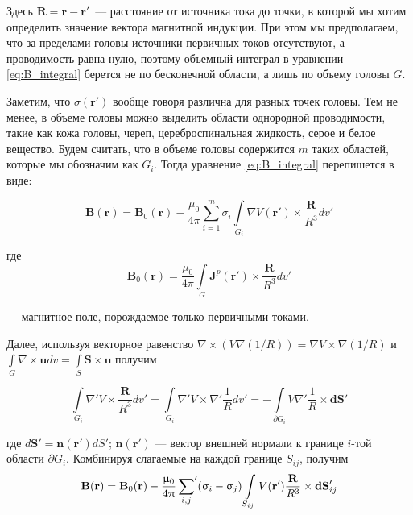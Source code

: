 Здесь $\mathbf{R} = \mathbf{r} - \mathbf{r}'$~--- расстояние от источника тока до точки,
в которой мы хотим определить значение вектора магнитной индукции.
При этом мы предполагаем, что за пределами головы источники первичных токов отсутствуют,
а проводимость равна нулю, поэтому объемный интеграл в уравнении \ref{eq:B_integral}
берется не по бесконечной области, а лишь по объему головы $G$.

Заметим, что $\sigma(\mathbf{r}')$ вообще говоря различна для разных точек головы.
Тем не менее, в объеме головы можно выделить области однородной проводимости, такие как
кожа головы, череп, цереброспинальная жидкость, серое и белое вещество.
Будем считать, что в объеме головы содержится $m$ таких областей, которые мы обозначим как $G_i$.
Тогда уравнение \ref{eq:B_integral} перепишется в виде:

\begin{equation}
    \mathbf{B}(\mathbf{r}) = \mathbf{B}_0(\mathbf{r}) -
\frac{\mu_0}{4\pi}\sum_{i=1}^{m}\sigma_i \int \limits_{G_i} \nabla V(\mathbf{r}')
\times \frac{\mathbf{R}}{R^3} dv'
    \label{eq:B_integral_1}
\end{equation}

где
\begin{equation}
    \mathbf{B}_0(\mathbf{r}) =
    \frac{\mu_0}{4\pi}\int \limits_{G} \mathbf{J}^p(\mathbf{r}') \times \frac{\mathbf{R}}{R^3} dv'
    \label{eq:B_0_def}
\end{equation}

--- магнитное поле, порождаемое только первичными токами.

Далее, используя векторное равенство $\nabla \times (V \nabla(1/R)) = \nabla V \times \nabla (1/R)$
и $\int \limits_{G} \nabla \times \mathbf{u} dv = \int \limits_{S} \mathbf{S}\times\mathbf{u}$
получим

\begin{equation}
    \int \limits_{G_i} \nabla' V \times \frac{\mathbf{R}}{R^3} dv' =
    \int\limits_{G_i} \nabla' V \times \nabla' \frac{1}{R} dv' =
    - \int \limits_{\partial G_i} V \nabla' \frac{1}{R} \times \mathbf{dS}'
\end{equation}

где $d\mathbf{S}' = \mathbf{n}(\mathbf{r}') dS'$; $\mathbf{n}(\mathbf{r}')$ ---
вектор внешней нормали к границе $i$-той области $\partial G_i$. Комбинируя слагаемые на каждой границе $S_{ij}$,
получим
\begin{equation}
        \mathbf{B}(\mathbf{r}) = \mathbf{B}_0(\mathbf{r}) -
        \frac{\mu_0}{4\pi}\sideset{}{'}\sum_{i,j}(\sigma_i - \sigma_j) \int \limits_{S_{ij}} V(\mathbf{r}')
        \frac{\mathbf{R}}{R^3} \times \mathbf{dS}'_{ij}
        \label{eq:B_surf}
\end{equation}

